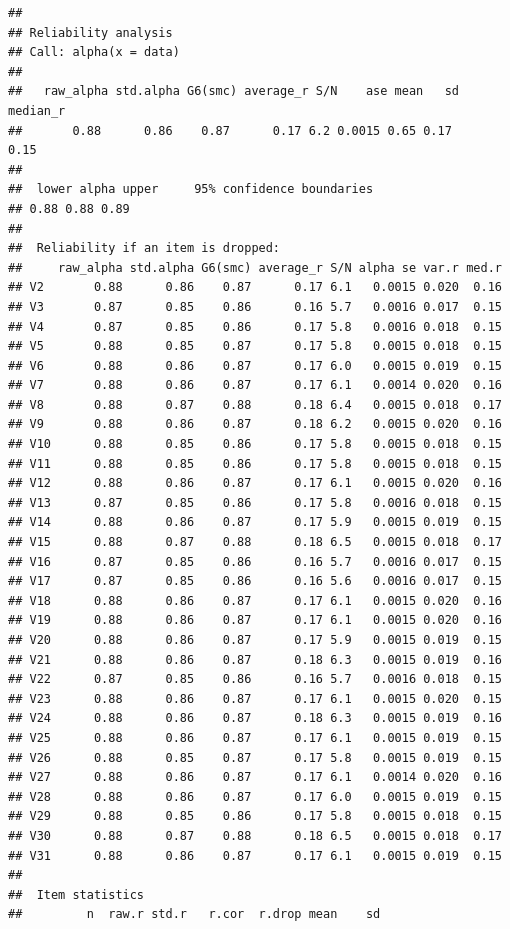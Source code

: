 \documentclass[
  english,
  man,floatsintext]{apa6}
\begin{document}
\begin{verbatim}
## 
## Reliability analysis   
## Call: alpha(x = data)
## 
##   raw_alpha std.alpha G6(smc) average_r S/N    ase mean   sd median_r
##       0.88      0.86    0.87      0.17 6.2 0.0015 0.65 0.17     0.15
## 
##  lower alpha upper     95% confidence boundaries
## 0.88 0.88 0.89 
## 
##  Reliability if an item is dropped:
##     raw_alpha std.alpha G6(smc) average_r S/N alpha se var.r med.r
## V2       0.88      0.86    0.87      0.17 6.1   0.0015 0.020  0.16
## V3       0.87      0.85    0.86      0.16 5.7   0.0016 0.017  0.15
## V4       0.87      0.85    0.86      0.17 5.8   0.0016 0.018  0.15
## V5       0.88      0.85    0.87      0.17 5.8   0.0015 0.018  0.15
## V6       0.88      0.86    0.87      0.17 6.0   0.0015 0.019  0.15
## V7       0.88      0.86    0.87      0.17 6.1   0.0014 0.020  0.16
## V8       0.88      0.87    0.88      0.18 6.4   0.0015 0.018  0.17
## V9       0.88      0.86    0.87      0.18 6.2   0.0015 0.020  0.16
## V10      0.88      0.85    0.86      0.17 5.8   0.0015 0.018  0.15
## V11      0.88      0.85    0.86      0.17 5.8   0.0015 0.018  0.15
## V12      0.88      0.86    0.87      0.17 6.1   0.0015 0.020  0.16
## V13      0.87      0.85    0.86      0.17 5.8   0.0016 0.018  0.15
## V14      0.88      0.86    0.87      0.17 5.9   0.0015 0.019  0.15
## V15      0.88      0.87    0.88      0.18 6.5   0.0015 0.018  0.17
## V16      0.87      0.85    0.86      0.16 5.7   0.0016 0.017  0.15
## V17      0.87      0.85    0.86      0.16 5.6   0.0016 0.017  0.15
## V18      0.88      0.86    0.87      0.17 6.1   0.0015 0.020  0.16
## V19      0.88      0.86    0.87      0.17 6.1   0.0015 0.020  0.16
## V20      0.88      0.86    0.87      0.17 5.9   0.0015 0.019  0.15
## V21      0.88      0.86    0.87      0.18 6.3   0.0015 0.019  0.16
## V22      0.87      0.85    0.86      0.16 5.7   0.0016 0.018  0.15
## V23      0.88      0.86    0.87      0.17 6.1   0.0015 0.020  0.15
## V24      0.88      0.86    0.87      0.18 6.3   0.0015 0.019  0.16
## V25      0.88      0.86    0.87      0.17 6.1   0.0015 0.019  0.15
## V26      0.88      0.85    0.87      0.17 5.8   0.0015 0.019  0.15
## V27      0.88      0.86    0.87      0.17 6.1   0.0014 0.020  0.16
## V28      0.88      0.86    0.87      0.17 6.0   0.0015 0.019  0.15
## V29      0.88      0.85    0.86      0.17 5.8   0.0015 0.018  0.15
## V30      0.88      0.87    0.88      0.18 6.5   0.0015 0.018  0.17
## V31      0.88      0.86    0.87      0.17 6.1   0.0015 0.019  0.15
## 
##  Item statistics 
##         n  raw.r std.r   r.cor  r.drop mean    sd

\end{verbatim}
\end{document}
